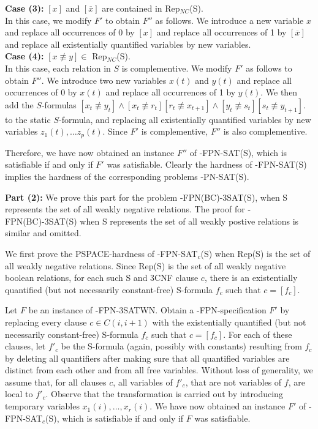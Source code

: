 \noindent
{\bf Case (3):} $[x]$ and $[\overline{x}]$ are contained in 
{\sf Rep$_{NC}$(S)}.\\
In this case, we modify $F'$ to obtain $F''$ as follows.
We introduce a new variable $x$ and replace all occurrences of
0 by $[x]$ and replace all occurrences of 1 by $[\overline{x}]$ and 
replace all existentially quantified variables by new variables. \\

\noindent
{\bf Case (4):} $[x \not\equiv y] \in$  {\sf Rep$_{NC}$(S)}.\\
In this case, each relation in $S$ is complementive.
We modify $F'$ as follows to obtain $F''$.
We introduce two new variables $x(t)$ and $y(t)$ and replace all occurrences of
0   by $x(t)$ and 
replace all occurrences of 1  by $y(t)$. We then add 
the $S$-formulas $[x_t \not\equiv y_t] \wedge [x_t \not \equiv r_{t}]
[r_t \not \equiv x_{t+1}] \wedge [y_t \not\equiv s_{t}]
[s_t \not\equiv y_{t+1}]$.  
to the static $S$-formula, and 
replacing all existentially quantified variables by new variables
$z_1(t), \ldots z_p(t)$.
Since $F'$ is complementive, $F''$ is also complementive.



Therefore, we have now obtained an instance $F''$ 
of {-FPN-SAT(S)}, which is satisfiable
if and only if $F'$ was satisfiable. Clearly the hardness of
{-FPN-SAT(S)} implies the hardness of the corresponding problems 
{-PN-SAT(S)}.


\noindent
{\bf Part (2): }
We prove  this part for the problem {-FPN(BC)-3SAT(S)}, when 
{\sf S} represents the set of all weakly negative relations.
The proof for {-FPN(BC)-3SAT(S)} when {\sf S} represents 
the set of all weakly postive relations is similar and omitted.

We first prove the {\sf PSPACE}-hardness of {-FPN-SAT$_c$(S)}
when {\sf Rep(S)} is the set of all weakly negative relations.
Since {\sf Rep(S)} is the set of all weakly negative  boolean relations,
for each such {\sf S} and {\sf 3CNF} clause $c$,
there is an existentially quantified (but not necessarily constant-free)
{\sf S}-formula $f_c$ such that $c=[f_c]$. 

Let $F$ be an instance of {-FPN-3SATWN}. 
Obtain a {-FPN}-specification $F'$ 
by replacing every clause $c \in C(i, i+1)$ with the 
existentially quantified (but not necessarily constant-free)
{\sf S}-formula $f_c$ such that $c=[f_c]$. For each of these clauses,
let $f'_c$ be the {\sf S}-formula (again, possibly with
constants) resulting from $f_{c}$ by deleting
all quantifiers after making sure that all quantified variables are
distinct from each other and from all free variables.  Without loss of
generality, we assume that, for all clauses $c$,
all variables of $f'_c$, that are not variables
of $f$, are local to $f'_c$.
Observe that the transformation is carried out by introducing temporary
variables $x_1(i), \ldots, x_r(i)$.
We have now obtained an instance $F'$ of {-FPN-SAT$_c$(S)}, 
which is satisfiable if and only if $F$ was satisfiable. 

